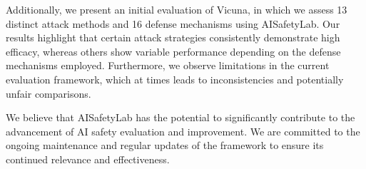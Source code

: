Additionally, we present an initial evaluation of Vicuna, in which we assess 13 distinct attack methods and 16 defense mechanisms using AISafetyLab. Our results highlight that certain attack strategies consistently demonstrate high efficacy, whereas others show variable performance depending on the defense mechanisms employed. Furthermore, we observe limitations in the current evaluation framework, which at times leads to inconsistencies and potentially unfair comparisons. 

We believe that AISafetyLab has the potential to significantly contribute to the advancement of AI safety evaluation and improvement. We are committed to the ongoing maintenance and regular updates of the framework to ensure its continued relevance and effectiveness.


